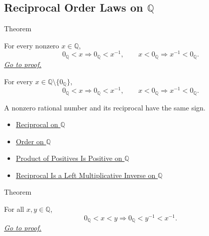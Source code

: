 \subsection*{\texorpdfstring{Reciprocal Order Laws on $\mathbb{Q}$}{Reciprocal Order Laws on Q}}

\begin{theorembox}{Theorem}
\begin{theorem}
\label{thm:sign-of-reciprocal-q}
For every nonzero $x\in\mathbb{Q}$,
\[
0_{\mathbb{Q}}<x \Longrightarrow 0_{\mathbb{Q}}<x^{-1},
\qquad
x<0_{\mathbb{Q}} \Longrightarrow x^{-1}<0_{\mathbb{Q}}.
\]
\hyperref[prf:sign-of-reciprocal-q]{\textit{Go to proof.}}
\end{theorem}
\end{theorembox}

\begin{remark*}
For every $x\in\mathbb{Q}\setminus\{0_{\mathbb{Q}}\}$,
\[
0_{\mathbb{Q}}<x\Longrightarrow 0_{\mathbb{Q}}<x^{-1},
\qquad
x<0_{\mathbb{Q}}\Longrightarrow x^{-1}<0_{\mathbb{Q}}.
\]
\end{remark*}

\begin{remark*}[Interpretation]
A nonzero rational number and its reciprocal have the same sign.
\end{remark*}

\begin{dependencies}
\begin{itemize}
  \item \hyperref[def:reciprocal-on-q-classes]{Reciprocal on $\mathbb{Q}$}
  \item \hyperref[def:order-on-q]{Order on $\mathbb{Q}$}
  \item \hyperref[prop:product-of-positives-is-positive-q]{Product of Positives Is Positive on $\mathbb{Q}$}
  \item \hyperref[thm:reciprocal-left-multiplicative-inverse-on-q]{Reciprocal Is a Left Multiplicative Inverse on $\mathbb{Q}$}
\end{itemize}
\end{dependencies}

\begin{theorembox}{Theorem}
\begin{theorem}
\label{thm:reciprocal-reverses-order-on-positives-q}
For all $x,y\in\mathbb{Q}$,
\[
0_{\mathbb{Q}}<x<y
\Longrightarrow
0_{\mathbb{Q}}<y^{-1}<x^{-1}.
\]
\hyperref[prf:reciprocal-reverses-order-on-positives-q]{\textit{Go to proof.}}
\end{theorem}
\end{theorembox}

